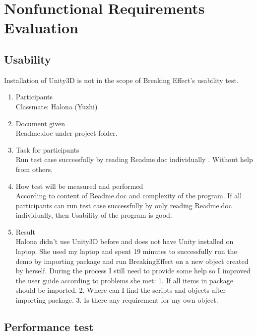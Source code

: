 \documentclass[12pt, titlepage]{article}
\begin{document}
\section{Nonfunctional Requirements Evaluation}

\subsection{Usability}

	Installation of Unity3D is not in the scope of Breaking Effect's usability test.

\begin{enumerate}
	
	\item{Participants\\}
	Classmate: Halona (Yuzhi)	
	
	\item{Document given\\}
	Readme.doc under project folder.
	
	\item{Task for participants\\}
	Run test case successfully by reading Readme.doc individually . Without help from
	others.
	
	\item{How test will be measured and performed\\}
	According to content of Readme.doc and complexity of the program. If all participants can run test case successfully by only reading Readme.doc individually, then Usability of the program is good.
	
	\item{Result\\} Halona didn't use Unity3D before and does not have Unity installed on laptop. She used my laptop and spent 19 minutes to successfully run the demo by importing package and run BreakingEffect on a new object created by herself. During the process I still need to provide some help so I improved the user guide according to problems she met: 1. If all items in package should be imported. 
	2. Where can I find the scripts and objects after importing package.
	3. Is there any requirement for my own object.
\end{enumerate}


\subsection{Performance test}
\end{document}

